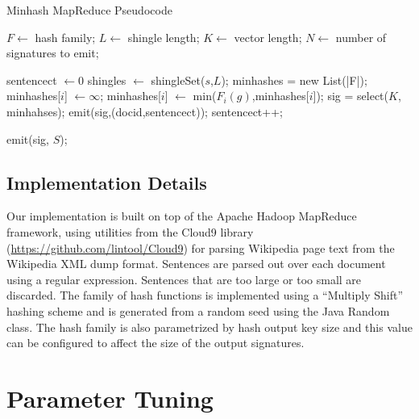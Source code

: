 \documentclass{acm_proc_article-sp}
\begin{document}
\begin{table}
\begin{algorithm}[H]
\caption{Minhash MapReduce Pseudocode}
\begin{algorithmic}
 \State $F \gets $ hash family;
 \State $L \gets $ shingle length;
 \State $K \gets $ vector length;
 \State $N \gets $ number of signatures to emit;
\EndFunction

 \State sentencect $\gets 0$
  \State shingles $\gets$ shingleSet($s$,$L$);
  \State minhashes = new List(|F|);
    \State minhashes[$i$] $\gets \infty$;
   \EndFor
     \State minhashes[$i$] $\gets$ min($F_i(g)$,minhashes[$i$]);
    \EndFor
   \EndFor
   \State sig = select($K$, minhahses);
   \State emit(sig,(docid,sentencect));
  \EndFor
  \State  sentencect++;
 \EndWhile
\EndFunction

\State emit(sig, $S$);
\EndIf
\EndFunction
\end{algorithmic}
\end{algorithm}
\end{table}

\subsection{Implementation Details}

Our implementation is built on top of the Apache Hadoop MapReduce framework, using utilities from the Cloud9 library (\url{https://github.com/lintool/Cloud9}) for parsing Wikipedia page text from the Wikipedia XML dump format. Sentences are parsed out over each document using a regular expression. Sentences that are too large or too small are discarded. The family of hash functions is implemented using a ``Multiply Shift''  \cite{} hashing scheme and is generated from a random seed using the Java Random class. The hash family is also parametrized by hash output key size and this value can be configured to affect the size of the output signatures.

\section{Parameter Tuning}
\end{document}
